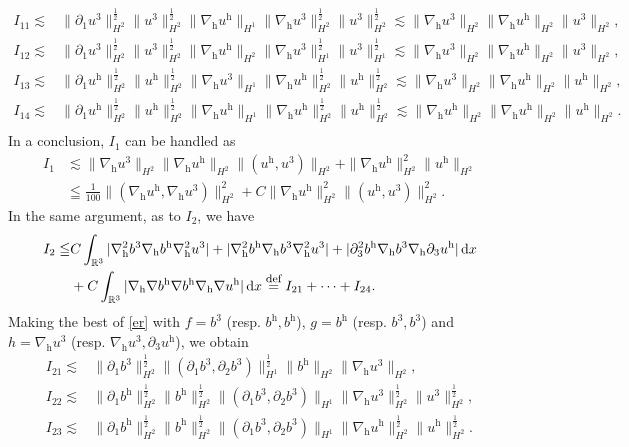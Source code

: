 \documentclass[11pt]{amsart}
\theoremstyle{definition}
\newcommand{\R}{\mathbb{R}}
\newcommand{\h}{\mathrm{h}}
\def\eqdefa{\buildrel\hbox{\footnotesize def}\over =}
\newcommand{\dx}{\,{\rm d}x}
\newcommand{\nablah}{\nabla_{\mathrm{h}}}
\numberwithin{equation}{section}
\begin{document}
\begin{align*}
	I_{11}\lesssim&\|\partial_1u^3\|_{H^2}^\frac12\|u^3\|_{H^2}^\frac12\|\nablah u^\h\|_{H^1}\|\nablah u^3\|_{H^2}^\frac12\|u^3\|_{H^2}^\frac12\lesssim \|\nablah u^3\|_{H^2}\|\nablah u^\h\|_{H^2}\| u^3\|_{H^2},\\
	I_{12}\lesssim&\|\partial_1u^3\|_{H^2}^\frac12\|u^3\|_{H^2}^\frac12\|\nablah u^\h\|_{H^2}\|\nablah u^3\|_{H^1}^\frac12\|u^3\|_{H^1}^\frac12\lesssim \|\nablah u^3\|_{H^2}\|\nablah u^\h\|_{H^2}\| u^3\|_{H^2},\\
	I_{13}\lesssim&\|\partial_1u^\h\|_{H^2}^\frac12\|u^\h\|_{H^2}^\frac12\|\nablah u^3\|_{H^1}\|\nablah u^\h\|_{H^2}^\frac12\|u^\h\|_{H^2}^\frac12\lesssim \|\nablah u^3\|_{H^2}\|\nablah u^\h\|_{H^2}\| u^\h\|_{H^2},\\
	I_{14}\lesssim&\|\partial_1u^\h\|_{H^2}^\frac12\|u^\h\|_{H^2}^\frac12\|\nablah u^\h\|_{H^1}\|\nablah u^\h\|_{H^2}^\frac12\|u^\h\|_{H^2}^\frac12\lesssim \|\nablah u^\h\|_{H^2}\|\nablah u^\h\|_{H^2}\| u^\h\|_{H^2}.\\
\end{align*}
In a conclusion, $I_{1}$ can be handled as
\begin{align}\label{I_1}
	I_{1}&\lesssim \|\nablah u^3\|_{H^2}\|\nablah u^\h\|_{H^2}\| (u^\h,u^3)\|_{H^2}+\|\nablah u^\h\|_{H^2}^2\| u^\h\|_{H^2}\nonumber\\
	&\leqq\frac{1}{100}\|(\nablah u^\h,\nablah u^3)\|_{H^{2}}^{2}+C\|\nablah u^\h\|_{H^2}^2\| (u^\h,u^3)\|_{H^2}^2.
\end{align}
In the same argument, as to $I_2$, we have
\begin{align*}
	I_2\leqq &C\int_{\R^3}|\nablah^2b^3\nablah b^\h \nablah^2 u^3|+|\nablah^2b^\h\nablah b^3 \nablah^2 u^3|+|\partial_3^2b^\h\nablah b^3 \nablah\partial_3 u^\h|\dx\\
	&+C\int_{\R^3}|\nablah\nabla b^\h\nabla b^\h \nablah \nabla u^\h|\dx\eqdefa I_{21}+\cdots+I_{24}.
\end{align*}
Making the best of \eqref{er} with $f=b^3$ (resp. $b^\h,b^\h$), $g=b^\h$ (resp. $ b^3,b^3$)  and $h=\nabla_{\mathrm{h}}u^3$ (resp. $\nablah u^{3},\partial_3u^\h$), we obtain
\begin{align*}
	I_{21}\lesssim&\|\partial_1b^3\|_{H^2}^\frac12\|(\partial_1b^3,\partial_2b^3)\|_{H^1}^\frac12\|b^\h\|_{H^2}\|\nablah u^3\|_{H^2},\\
	I_{22}\lesssim&\|\partial_1b^\h\|_{H^2}^\frac12\|b^\h\|_{H^2}^\frac12\|(\partial_1b^3,\partial_2b^3)\|_{H^1}\|\nablah u^3\|_{H^2}^\frac12\|u^3\|_{H^2}^\frac12,\\
	I_{23}\lesssim&\|\partial_1b^\h\|_{H^2}^\frac12\|b^\h\|_{H^2}^\frac12\|(\partial_1b^3,\partial_2b^3)\|_{H^1}\|\nablah u^\h\|_{H^2}^\frac12\|u^\h\|_{H^2}^\frac12.
\end{align*}
\end{document}
